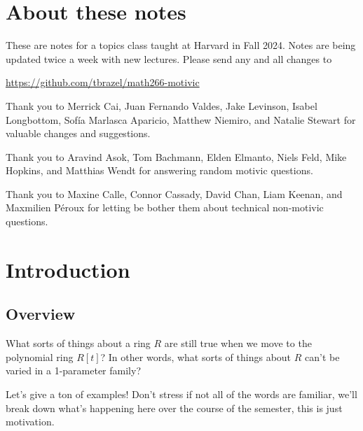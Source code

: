 \documentclass[11pt,openany]{book}
\begin{document}
\dominitoc

\maketitle


\setcounter{tocdepth}{1}
\tableofcontents{}
 

\setlength{\parskip}{0.2em}

\setcounter{section}{-1}

\section*{About these notes}

These are notes for a topics class taught at Harvard in Fall 2024. Notes are being updated twice a week with new lectures. Please send any and all changes to
\begin{center}
    \href{https://github.com/tbrazel/math266-motivic}{https://github.com/tbrazel/math266-motivic}
\end{center}
Thank you to Merrick Cai, Juan Fernando Valdes, Jake Levinson, Isabel Longbottom, Sof\'ia Marlasca Aparicio, Matthew Niemiro, and Natalie Stewart for valuable changes and suggestions.

Thank you to Aravind Asok, Tom Bachmann, Elden Elmanto, Niels Feld, Mike Hopkins, and Matthias Wendt for answering random motivic questions.

Thank you to Maxine Calle, Connor Cassady, David Chan, Liam Keenan, and Maxmilien P\'eroux for letting be bother them about technical non-motivic questions.


\section{Introduction}

\subsection{Overview} What sorts of things about a ring $R$ are still true when we move to the polynomial ring $R[t]$? In other words, what sorts of things about $R$ can't be varied in a 1-parameter family?

Let's give a ton of examples! Don't stress if not all of the words are familiar, we'll break down what's happening here over the course of the semester, this is just motivation.
\end{document}
